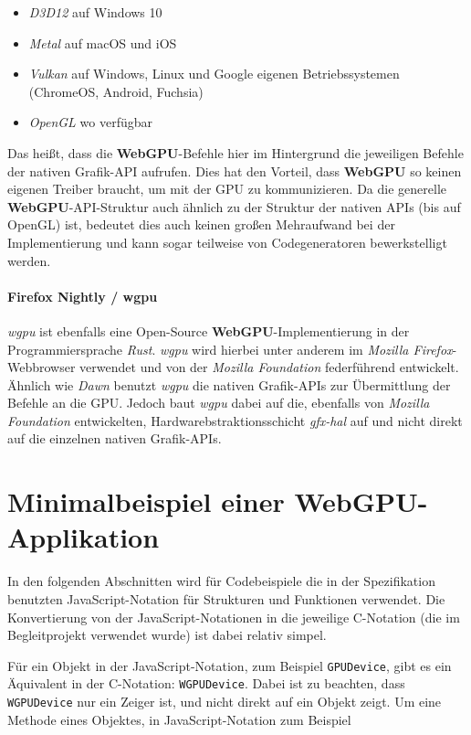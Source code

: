 \documentclass[oneside]{ausarbeitung}
\begin{document}
\begin{itemize}
\item{\textit{D3D12} auf Windows 10}
\item{\textit{Metal} auf macOS und iOS}
\item{\textit{Vulkan} auf Windows, Linux und Google eigenen Betriebssystemen (ChromeOS, Android, Fuchsia)}
\item{\textit{OpenGL} wo verfügbar}
\end{itemize}

Das heißt, dass die \textbf{WebGPU}-Befehle hier im Hintergrund die jeweiligen Befehle der nativen Grafik-API aufrufen. Dies hat den Vorteil, dass \textbf{WebGPU} so keinen eigenen Treiber braucht, um mit der \ac{GPU} zu kommunizieren. Da die generelle \textbf{WebGPU}-API-Struktur auch ähnlich zu der Struktur der nativen APIs (bis auf OpenGL) ist, bedeutet dies auch keinen großen Mehraufwand bei der Implementierung und kann sogar teilweise von Codegeneratoren bewerkstelligt werden.

\subsubsection{Firefox Nightly \cite{mozilla:firefox_nightly} / wgpu \cite{mozilla:wgpu}}
\textit{wgpu} ist ebenfalls eine Open-Source \textbf{WebGPU}-Implementierung in der Programmiersprache \textit{Rust}. \textit{wgpu} wird hierbei unter anderem im \textit{Mozilla Firefox}-Webbrowser verwendet und von der \textit{Mozilla Foundation} federführend entwickelt. Ähnlich wie \textit{Dawn} benutzt \textit{wgpu} die nativen Grafik-APIs zur Übermittlung der Befehle an die \ac{GPU}. Jedoch baut \textit{wgpu} dabei auf die, ebenfalls von \textit{Mozilla Foundation} entwickelten, Hardwarebstraktionsschicht \textit{gfx-hal} auf und nicht direkt auf die einzelnen nativen Grafik-APIs.

\chapter{Minimalbeispiel einer WebGPU-Applikation}
\label{cha:example}

In den folgenden Abschnitten wird für Codebeispiele die in der Spezifikation benutzten JavaScript-Notation für Strukturen und Funktionen verwendet. Die Konvertierung von der JavaScript-Notationen in die jeweilige C-Notation (die im Begleitprojekt verwendet wurde) ist dabei relativ simpel.

Für ein Objekt in der JavaScript-Notation, zum Beispiel \texttt{GPUDevice}, gibt es ein Äquivalent in der C-Notation: \texttt{WGPUDevice}. Dabei ist zu beachten, dass \texttt{WGPUDevice} nur ein Zeiger ist, und nicht direkt auf ein Objekt zeigt. Um eine Methode eines Objektes, in JavaScript-Notation zum Beispiel 
\end{document}
